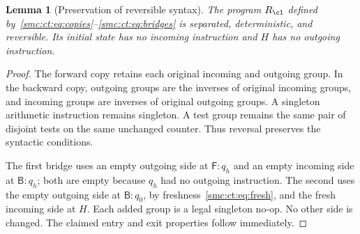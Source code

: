 \documentclass[11pt,letterpaper]{article}
\numberwithin{equation}{section}
\newtheorem{lemma}[theorem]{Lemma}
\theoremstyle{definition}
\theoremstyle{remark}
\newcommand{\Fq}[1]{\mathsf F\!:#1}\newcommand{\Bq}[1]{\mathsf B\!:#1}
\begin{document}
\begin{lemma}[Preservation of reversible syntax]\label{smc:ct:lem:syntax}
The program $R_{\cl}$ defined by~\eqref{smc:ct:eq:copies}--\eqref{smc:ct:eq:bridges} is separated, deterministic, and reversible. Its initial state has no incoming instruction and $H$ has no outgoing instruction.
\end{lemma}
\begin{proof}
The forward copy retains each original incoming and outgoing group. In the backward copy, outgoing groups are the inverses of original incoming groups, and incoming groups are inverses of original outgoing groups. A singleton arithmetic instruction remains singleton. A test group remains the same pair of disjoint tests on the same unchanged counter. Thus reversal preserves the syntactic conditions.

The first bridge uses an empty outgoing side at $\Fq {q_h}$ and an empty incoming side at $\Bq {q_h}$; both are empty because $q_h$ had no outgoing instruction. The second uses the empty outgoing side at $\Bq {q_0}$, by freshness~\eqref{smc:ct:eq:fresh}, and the fresh incoming side at $H$. Each added group is a legal singleton no-op. No other side is changed. The claimed entry and exit properties follow immediately.
\end{proof}
\end{document}
